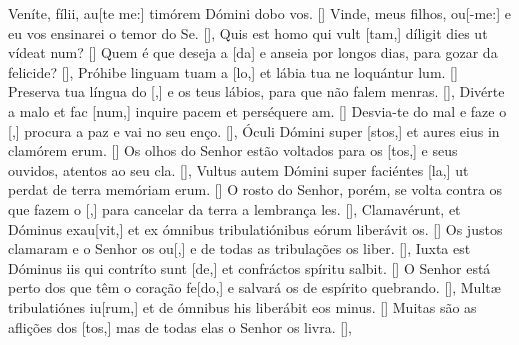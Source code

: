 {    %
    {Veníte, fílii, au[te me:] timórem Dómini dobo vos. [\LinkLA]}%
        {Vinde, meus filhos, ou[-me:] e eu vos ensinarei o temor do Se. [\LinkPT]},
    {Quis est homo qui vult [tam,] díligit dies ut vídeat \-num? [\LinkLA]}%
        {Quem é que deseja a [da] e anseia por longos dias, para gozar da felicide? [\LinkPT]},
    {Próhibe linguam tuam a [lo,] et lábia tua ne lo\-quántur \-lum. [\LinkLA]}%
        {Preserva tua língua do [,] e os teus lábios, para que não falem menras. [\LinkPT]},
    {Divérte a malo et fac [num,] inquire pacem et perséquere am. [\LinkLA]}%
        {Desvia-te do mal e faze o [,] procura a paz e vai no seu enço. [\LinkPT]},
    {Óculi Dómini super [stos,] et aures eius in clamórem erum. [\LinkLA]}%
        {Os olhos do Senhor estão voltados para os [tos,] e seus ouvidos, atentos ao seu cla. [\LinkPT]},
    {Vultus autem Dómini super faciéntes [la,] ut perdat de ter\-ra memóriam erum. [\LinkLA]}%
        {O rosto do Senhor, porém, se volta contra os que fazem o [,] para cancelar da terra a lembrança les. [\LinkPT]},
    {Clamavérunt, et Dóminus exau[vit,] et ex ómnibus tribulatiónibus eórum liberávit os. [\LinkLA]}%
        {Os justos clamaram e o Senhor os ou[,] e de todas as tribulações os liber. [\LinkPT]},
    {Iuxta est Dóminus iis qui contríto sunt [de,] et confráctos spíritu salbit. [\LinkLA]}%
        {O Senhor está perto dos que têm o coração fe[do,] e salvará os de espírito quebrando. [\LinkPT]},
    {Multæ tribulatiónes iu[rum,] et de ómnibus his liberábit eos minus. [\LinkLA]}%
        {Muitas são as aflições dos [tos,] mas de todas elas o Senhor os livra. [\LinkPT]},
}
